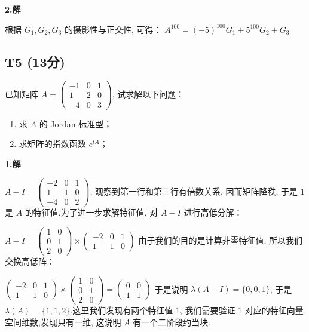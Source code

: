 \documentclass{article}
\begin{document}
\par \textbf{2.解}

根据 $G_1, G_2, G_3$ 的摄影性与正交性, 可得： $A^{100}=(-5)^{100}G_1+5^{100}G_2 + G_3$

\subsection{T5 (13分)}

\par 已知矩阵 $A=\begin{pmatrix}
	-1 & 0 & 1\\
	1 & 2 & 0\\
	-4 & 0 & 3
\end{pmatrix}$, 试求解以下问题：

\begin{enumerate}
	\item 求 $A$ 的 Jordan 标准型；
	\item 求矩阵的指数函数 $e^{tA}$；
\end{enumerate}

\par \textbf{1.解}

$A-I=\begin{pmatrix}
	-2 & 0 & 1\\
	1 & 1 & 0\\
	-4 & 0 & 2
\end{pmatrix}$, 观察到第一行和第三行有倍数关系, 因而矩阵降秩, 于是 $1$ 是 $A$ 的特征值.为了进一步求解特征值, 对 $A-I$ 进行高低分解：

$A-I=\begin{pmatrix}
	1 & 0\\
	0 & 1\\
	2 & 0
\end{pmatrix}\times \begin{pmatrix}
	-2 & 0 & 1\\
	1 & 1 & 0
\end{pmatrix}$ 由于我们的目的是计算非零特征值, 所以我们交换高低阵：

$\begin{pmatrix}
	-2 & 0 & 1\\
	1 & 1 & 0
\end{pmatrix} \times \begin{pmatrix}
1 & 0\\
0 & 1\\
2 & 0
\end{pmatrix}=\begin{pmatrix}
	0 & 0\\
	1 & 1
\end{pmatrix}$ 于是说明 $\lambda(A-I)=\{0, 0, 1\}$, 于是 $\lambda(A)=\{1, 1, 2\}$.这里我们发现有两个特征值 $1$, 我们需要验证 $1$ 对应的特征向量空间维数,发现只有一维, 这说明 $A$ 有一个二阶段约当块.
\end{document}
